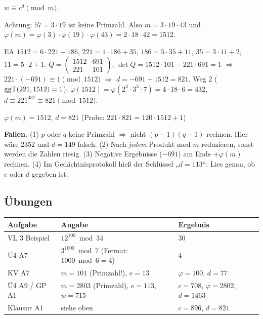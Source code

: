  $w \equiv c^d \pmod m$.

 Achtung: $57 = 3 \cdot 19$ ist keine Primzahl. Also $m = 3 \cdot 19 \cdot 43$ und $\varphi(m) = \varphi(3) \cdot \varphi(19) \cdot \varphi(43) = 2 \cdot 18 \cdot 42 = 1512$.

 EA $1512 = 6 \cdot 221 + 186$, $221 = 1 \cdot 186 + 35$, $186 = 5 \cdot 35 + 11$, $35 = 3 \cdot 11 + 2$, $11 = 5 \cdot 2 + 1$.
$Q = \begin{pmatrix}1512 & 691\\ 221 & 101\end{pmatrix}$, $\det Q = 1512 \cdot 101 - 221 \cdot 691 = 1$ $\Rightarrow$ $221 \cdot (-691) \equiv 1 \pmod{1512}$ $\Rightarrow$ $d = -691 + 1512 = 821$.
Weg 2 ($\operatorname{ggT}(221, 1512) = 1$): $\varphi(1512) = \varphi(2^3 \cdot 3^3 \cdot 7) = 4 \cdot 18 \cdot 6 = 432$, $d \equiv 221^{431} \equiv 821 \pmod{1512}$.
\begin{ergebnis} $\varphi(m) = 1512$, $d = 821$ (Probe: $221 \cdot 821 = 120 \cdot 1512 + 1$) \end{ergebnis}

\begin{achtung}
\textbf{Fallen.} (1) $p$ oder $q$ keine Primzahl $\Rightarrow$ nicht $(p-1)(q-1)$ rechnen. Hier wäre $2352$ und $d = 149$ falsch.
(2) Nach \emph{jedem} Produkt mod $m$ reduzieren, sonst werden die Zahlen riesig.
(3) Negative Ergebnisse ($-691$) am Ende $+\varphi(m)$ rechnen.
(4) Im Gedächtnisprotokoll hieß der Schlüssel „$d = 113$“: Lies genau, ob $e$ oder $d$ gegeben ist.
\end{achtung}

\subsection*{Übungen}
\begin{tabular}{@{}lll@{}}
\toprule
Aufgabe & Angabe & Ergebnis\\
\midrule
VL 3 Beispiel & $12^{100} \bmod 34$ & $30$\\
Ü4 A7 & $3^{1000} \bmod 7$ (Fermat: $1000 \bmod 6 = 4$) & $4$\\
KV A7 & $m = 101$ (Primzahl!), $e = 13$ & $\varphi = 100$, $d = 77$\\
Ü4 A9 / GP A1 & $m = 2803$ (Primzahl), $e = 113$, $w = 715$ & $c = 708$, $\varphi = 2802$, $d = 1463$\\
Klausur A1 & siehe oben & $c = 896$, $d = 821$\\
\bottomrule
\end{tabular}

